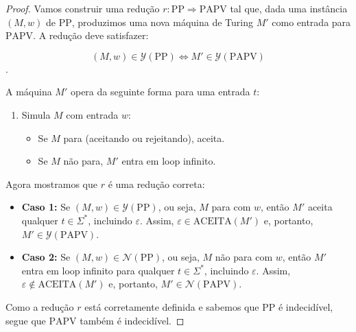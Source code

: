 \documentclass{article}
\begin{document}
\renewcommand{\proofname}{\textbf{Demonstração}}
\begin{proof}
    Vamos construir uma redução $r : \mathrm{PP} \Rightarrow
    \mathrm{PAPV}$ tal que, dada uma instância $(M, w)$ de
    $\mathrm{PP}$, produzimos uma nova máquina de Turing $M'$ como
    entrada para $\mathrm{PAPV}$. A redução deve satisfazer:

    $$(M, w) \in \mathcal{Y}(\mathrm{PP})
    \iff M' \in \mathcal{Y}(\mathrm{PAPV})$$.

    \noindent A máquina $M'$ opera da seguinte forma para uma entrada $t$:

    \begin{enumerate}[itemsep={2pt}, topsep={4pt}, parsep={0pt},
            label={\textbf{\arabic{*}.}}]
        \item Simula $M$ com entrada $w$:
            \begin{itemize}
                \item Se $M$ para (aceitando ou rejeitando), aceita.
                \item Se $M$ não para, $M'$ entra em loop infinito.
            \end{itemize}
    \end{enumerate}

    \vspace{8pt}

    \noindent Agora mostramos que $r$ é uma redução correta:

    \begin{itemize}[itemsep={2pt}, topsep={4pt}]
        \item \textbf{Caso 1:} Se $(M, w) \in
            \mathcal{Y}(\mathrm{PP})$, ou seja, $M$ para com $w$,
            então $M'$ aceita qualquer $t \in \Sigma^{*}$, incluindo
            $\varepsilon$. Assim, $\varepsilon \in
            \mathrm{ACEITA}(M')$ e, portanto, $M' \in
            \mathcal{Y}(\mathrm{PAPV})$.
        \item \textbf{Caso 2:} Se $(M, w) \in
            \mathcal{N}(\mathrm{PP})$, ou seja, $M$ não para com
            $w$, então $M'$ entra em loop infinito para qualquer $t
            \in \Sigma^{*}$, incluindo $\varepsilon$. Assim,
            $\varepsilon \notin \mathrm{ACEITA}(M')$ e, portanto, $M'
            \in \mathcal{N}(\mathrm{PAPV})$.
    \end{itemize}

    \vspace{8pt}

    \noindent Como a redução $r$ está corretamente definida e sabemos
    que $\mathrm{PP}$ é
    indecidível, segue que $\mathrm{PAPV}$ também é indecidível.
\end{proof}
\end{document}
